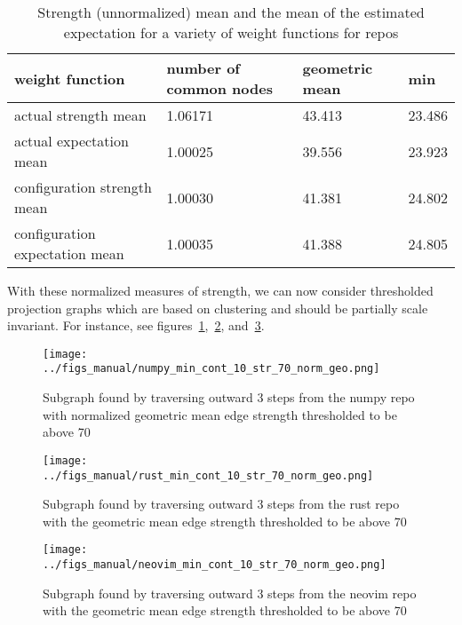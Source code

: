 \documentclass{pset}
\begin{document}
\begin{table}[ht]
\begin{tabular}{l|lll}
 weight function                & number of common nodes & geometric mean & min \\\hline
 actual strength mean           & 1.06171                & 43.413         & 23.486 \\\hline
 actual expectation mean        & 1.00025                & 39.556         & 23.923 \\\hline
 configuration strength mean    & 1.00030                & 41.381         & 24.802 \\\hline
 configuration expectation mean & 1.00035                & 41.388         & 24.805 \\\hline
\end{tabular}
\caption{Strength (unnormalized) mean and the mean of the estimated expectation for a
        variety of weight functions for repos}\label{tab:mean var norm}
\end{table}

With these normalized measures of strength, we can now consider thresholded
projection graphs which are based on clustering and should be partially scale
invariant. For instance, see figures~\ref{fig:numpy geo norm},~\ref{fig:rust geo norm},
and~\ref{fig:neovim geo norm}. 


\begin{figure}[ht]
\centering
\texttt{[image: ../figs\_manual/numpy\_min\_cont\_10\_str\_70\_norm\_geo.png]}
\caption{Subgraph found by traversing outward 3 steps from the numpy repo with
normalized geometric mean edge strength thresholded to be above 
70}\label{fig:numpy geo norm}
\end{figure}

\begin{figure}[ht]
\centering
\texttt{[image: ../figs\_manual/rust\_min\_cont\_10\_str\_70\_norm\_geo.png]}
\caption{Subgraph found by traversing outward 3 steps from the rust repo with
    the geometric mean edge strength thresholded to be above 70}\label{fig:rust geo norm}
\end{figure}

\begin{figure}[ht]
\centering
\texttt{[image: ../figs\_manual/neovim\_min\_cont\_10\_str\_70\_norm\_geo.png]}
\caption{Subgraph found by traversing outward 3 steps from the neovim repo with
    the geometric mean edge strength thresholded to be above 70}\label{fig:neovim geo norm}
\end{figure}
\end{document}
